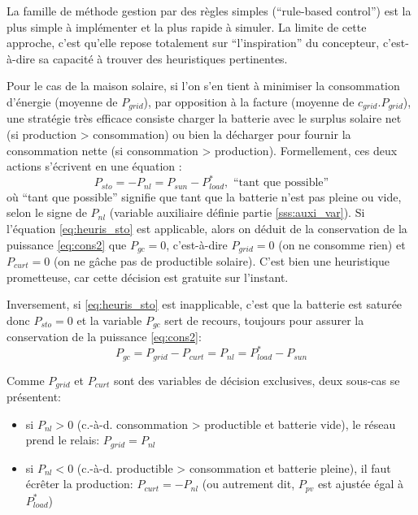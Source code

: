 \documentclass[a4paper,10pt,twocolumn]{article}
\begin{document}
La famille de méthode gestion par des règles simples (``rule-based control'')
est la plus simple à implémenter et la plus rapide à simuler.
La limite de cette approche, c'est qu'elle repose totalement
sur ``l'inspiration'' du concepteur, c'est-à-dire sa capacité à trouver
des heuristiques pertinentes.

Pour le cas de la maison solaire, si l'on s'en tient à minimiser
la consommation d'énergie (moyenne de $P_{grid}$),
par opposition à la facture (moyenne de $c_{grid}.P_{grid}$),
une stratégie très efficace consiste charger la batterie
avec le surplus solaire net (si production > consommation)
ou bien la décharger pour fournir la consommation nette (si consommation > production).
Formellement, ces deux actions s'écrivent en une équation :
%
\begin{equation} \label{eq:heuris_sto}
  P_{sto} = -P_{nl} = P_{sun} - P_{load}^*, \text{ ``tant que possible''}
\end{equation}
%
où ``tant que possible'' signifie que tant que la batterie n'est pas pleine ou vide,
selon le signe de $P_{nl}$
(variable auxiliaire définie partie \ref{sss:auxi_var}).
%
Si l'équation \eqref{eq:heuris_sto} est applicable, alors on déduit
de la conservation de la puissance \eqref{eq:cons2} que $P_{gc} = 0$,
c'est-à-dire $P_{grid} = 0$ (on ne consomme rien) et
$P_{curt} = 0$ (on ne gâche pas de productible solaire).
C'est bien une heuristique prometteuse, car cette décision est gratuite
sur l'instant.

Inversement, si \eqref{eq:heuris_sto} est inapplicable,
c'est que la batterie est saturée donc $P_{sto} = 0$
et la variable $P_{gc}$ sert de recours,
toujours pour assurer la conservation de la puissance \eqref{eq:cons2}:
%
\begin{equation}
  P_{gc} = P_{grid} - P_{curt} = P_{nl} = P_{load}^* - P_{sun}
\end{equation}

Comme $P_{grid}$ et $P_{curt}$ sont des variables de décision exclusives, deux sous-cas se présentent:
\begin{itemize}
 \item si $P_{nl}>0$ (c.-à-d. consommation > productible et batterie vide),
 le réseau prend le relais: $P_{grid} = P_{nl}$
 \item si $P_{nl}<0$ (c.-à-d. productible > consommation et batterie pleine),
 il faut écrêter la production: $P_{curt} = - P_{nl}$
 (ou autrement dit, $P_{pv}$ est ajustée égal à $P_{load}^*$)
\end{itemize}
\end{document}
